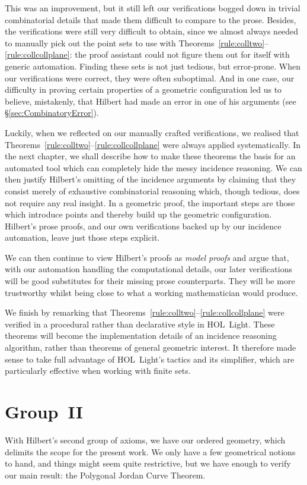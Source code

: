 This was an improvement, but it still left our verifications bogged down in trivial combinatorial details that made them difficult to compare to the prose. Besides, the verifications were still very difficult to obtain, since we almost always needed to manually pick out the point sets to use with Theorems~\ref{rule:colltwo}--\ref{rule:collcollplane}: the proof assistant could not figure them out for itself with generic automation. Finding these sets is not just tedious, but error-prone. When our verifications were correct, they were often suboptimal. And in one case, our difficulty in proving certain properties of a geometric configuration led us to believe, mistakenly, that Hilbert had made an error in one of his arguments (see \S\ref{sec:CombinatoryError}).

Luckily, when we reflected on our manually crafted verifications, we realised that Theorems~\ref{rule:colltwo}--\ref{rule:collcollplane} were always applied systematically. In the next chapter, we shall describe how to make these theorems the basis for an automated tool which can completely hide the messy incidence reasoning. We can then justify Hilbert's omitting of the incidence arguments by claiming that they consist merely of exhaustive combinatorial reasoning which, though tedious, does not require any real insight. In a geometric proof, the important steps are those which introduce points and thereby build up the geometric configuration. Hilbert's prose proofs, and our own verifications backed up by our incidence automation, leave just those steps explicit.

We can then continue to view Hilbert's proofs as \emph{model proofs} and argue that, with our automation handling the computational details, our later verifications will be good substitutes for their missing prose counterparts. They will be more trustworthy whilst being close to what a working mathematician would produce.

We finish by remarking that Theorems~\ref{rule:colltwo}--\ref{rule:collcollplane} were verified in a procedural rather than declarative style in HOL~Light. These theorems will become the implementation details of an incidence reasoning algorithm, rather than theorems of general geometric interest. It therefore made sense to take full advantage of HOL~Light's tactics and its simplifier, which are particularly effective when working with finite sets.

\section{Group~II}
With Hilbert's second group of axioms, we have our ordered geometry, which delimits the scope for the present work. We only have a few geometrical notions to hand, and things might seem quite restrictive, but we have enough to verify our main result: the Polygonal Jordan Curve Theorem.

